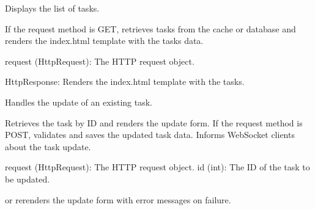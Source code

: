 \documentclass[letterpaper,10pt,english]{sphinxmanual}
\begin{document}

\begin{fulllineitems}
\label{\detokenize{tasks:tasks.views.index}}
\pysigstartsignatures
{}
\pysigstopsignatures
\sphinxAtStartPar
Displays the list of tasks.

\sphinxAtStartPar
If the request method is GET, retrieves tasks from the cache or database
and renders the index.html template with the tasks data.
\begin{description}
\sphinxAtStartPar
request (HttpRequest): The HTTP request object.

\sphinxAtStartPar
HttpResponse: Renders the index.html template with the tasks.

\end{description}

\end{fulllineitems}


\begin{fulllineitems}
\label{\detokenize{tasks:tasks.views.update_task}}
\pysigstartsignatures
{}
\pysigstopsignatures
\sphinxAtStartPar
Handles the update of an existing task.

\sphinxAtStartPar
Retrieves the task by ID and renders the update form. If the request method is POST,
validates and saves the updated task data. Informs WebSocket clients about the task update.
\begin{description}
\sphinxAtStartPar
request (HttpRequest): The HTTP request object.
id (int): The ID of the task to be updated.

\begin{description}
\sphinxAtStartPar
or re\sphinxhyphen{}renders the update form with error messages on failure.

\end{description}

\end{description}

\end{fulllineitems}
\end{document}
